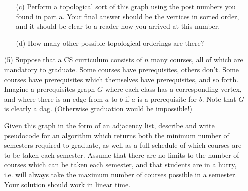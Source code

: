 \documentclass[12pt]{article}
\begin{document}
\begin{enumerate}
\begin{itemize}
    \item[(c)] Perform a topological sort of this graph using the post numbers you found in part a. Your final answer should be the vertices in sorted order, and it should be clear to a reader how you arrived at this number. 
    \item[(d)] How many other possible topological orderings are there?
\end{itemize}
\item[(5)] Suppose that a CS curriculum consists of $n$ many courses, all of which are mandatory to graduate. Some courses have prerequisites, others don't. Some courses have prerequisites which themselves have prerequisites, and so forth. Imagine a prerequisites graph $G$ where each class has a corresponding vertex, and where there is an edge from $a$ to $b$ if $a$ is a prerequisite for $b$. Note that $G$ is clearly a dag. (Otherwise graduation would be impossible!) \par Given this graph in the form of an adjacency list, describe and write pseudocode for an algorithm which returns both the minimum number of semesters required to graduate, as well as a full schedule of which courses are to be taken each semester. Assume that there are no limits to the number of courses which can be taken each semester, and that students are in a hurry, i.e. will always take the maximum number of courses possible in a semester. Your solution should work in linear time. 
\end{enumerate}
\end{document}
